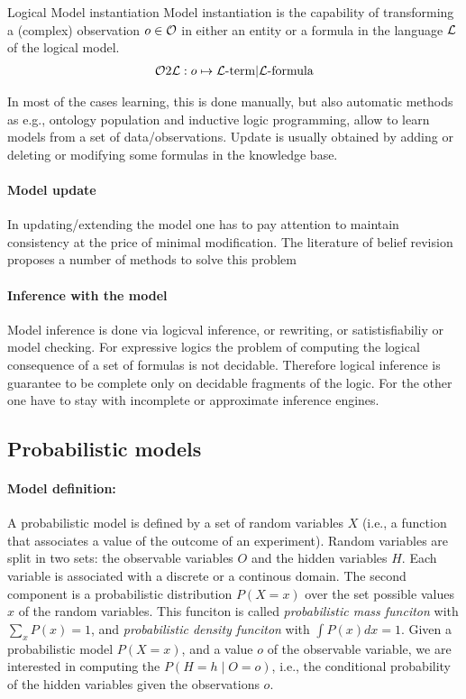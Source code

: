 \begin{definition}{Logical Model instantiation}
\label{def:logical-model-instantiation}
Model instantiation is the capability of transforming a (complex)
observation $o\in\mathcal{O}$ in either an entity or a formula 
in the language $\mathcal{L}$ of the logical model. 
\begin{align}
\mathcal{O}2\mathcal{L}:o\mapsto\text{$\mathcal{L}$-term}|\text{$\mathcal{L}$-formula}
\end{align}
\end{definition}




In most of the cases learning, this is done manually, but also
automatic methods as e.g., ontology population and inductive logic
programming, allow to learn models from a set of
data/observations. Update is usually obtained by adding or deleting or
modifying some formulas in the knowledge base.



\paragraph{Model update}
In updating/extending the model one has to pay attention to maintain
consistency at the price of minimal modification. The literature of
belief revision proposes a number of methods to solve this problem


\paragraph{Inference with the model}
Model inference is done via logicval inference, or rewriting, or
satistisfiabiliy or model checking.  For expressive logics the problem
of computing the logical consequence of a set of formulas is not
decidable. Therefore logical inference is guarantee to be complete
only on decidable fragments of the logic. For the other one have to
stay with incomplete or approximate inference engines.

\subsection{Probabilistic models}
\paragraph{Model definition:}
A probabilistic model \cite{murphy2012machine} is defined by a set of
random variables $X$ (i.e., a function that associates a value of the
outcome of an experiment). Random variables are split in two sets: the
observable variables $O$ and the hidden variables $H$. Each variable
is associated with a discrete or a continous domain. The second
component is a probabilistic distribution $P(X=x)$ over the set possible
values $x$ of the random variables. This funciton is called
\emph{probabilistic mass funciton} with $\sum_{x}P(x) = 1$, and
\emph{probabilistic density funciton} with $\int P(x) dx=1$.
Given a probabilistic model $P(X=x)$, and a value $o$ of the
observable variable, we are interested in computing the
$P(H=h\mid O=o)$, i.e., the conditional probability of the hidden
variables given the observations $o$. 

